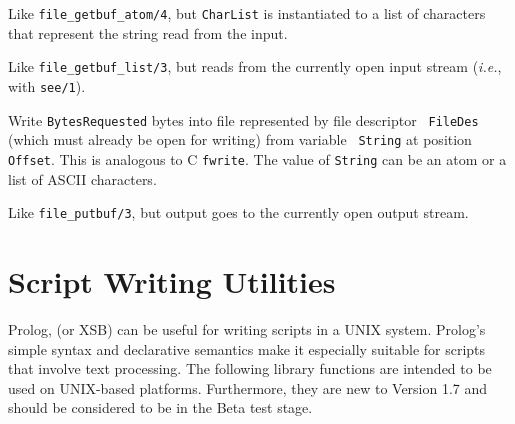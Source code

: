 \begin{description}
Like \verb|file_getbuf_atom/4|, but {\tt CharList} is instantiated to a list
of characters that represent the string read from the input.

Like \verb|file_getbuf_list/3|, but reads from the currently open input stream
({\it i.e.}, with {\tt see/1}).


Write {\tt BytesRequested} bytes into file represented by file descriptor {\tt
  FileDes} (which must already be open for writing) from variable {\tt
  String} at position {\tt Offset}. This is analogous to C {\tt fwrite}.
The value of {\tt String} can be an atom or a list of ASCII characters.

Like \verb|file_putbuf/3|, but output goes to the currently open output stream.


\end{description}

\section{Script Writing Utilities}

Prolog, (or XSB) can be useful for writing scripts in a UNIX system.
Prolog's simple syntax and declarative semantics make it especially
suitable for scripts that involve text processing.  The following
library functions are intended to be used on UNIX-based platforms.
Furthermore, they are new to Version 1.7 and should be considered to
be in the Beta test stage.

